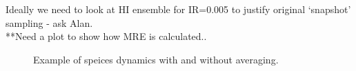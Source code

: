 Ideally we need to look at HI ensemble for IR=0.005 to justify original `snapshot' sampling - ask Alan.\\
**Need a plot to show how MRE is calculated..
\begin{figure}[hp]
	\centering
		
    \caption{Example of speices dynamics with and without averaging.}    
    \label{fig:maf_example}
\end{figure}

